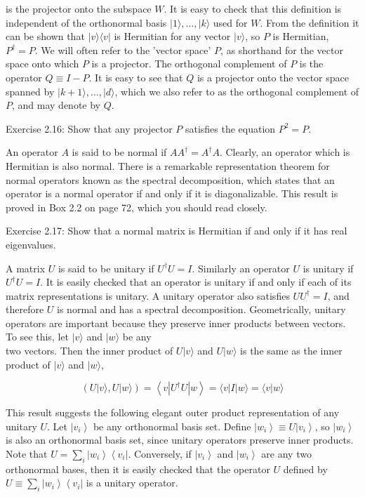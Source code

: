 is the projector onto the subspace $W$. It is easy to check that this definition is independent of the orthonormal basis $|1\rangle, \ldots,|k\rangle$ used for $W$. From the definition it can be shown that $|v\rangle\langle v|$ is Hermitian for any vector $|v\rangle$, so $P$ is Hermitian, $P^{\dagger}=P$. We will often refer to the 'vector space' $P$, as shorthand for the vector space onto which $P$ is a projector. The orthogonal complement of $P$ is the operator $Q \equiv I-P$. It is easy to see that $Q$ is a projector onto the vector space spanned by $|k+1\rangle, \ldots,|d\rangle$, which we also refer to as the orthogonal complement of $P$, and may denote by $Q$.

Exercise 2.16: Show that any projector $P$ satisfies the equation $P^{2}=P$.

An operator $A$ is said to be normal if $A A^{\dagger}=A^{\dagger} A$. Clearly, an operator which is Hermitian is also normal. There is a remarkable representation theorem for normal operators known as the spectral decomposition, which states that an operator is a normal operator if and only if it is diagonalizable. This result is proved in Box 2.2 on page 72, which you should read closely.

Exercise 2.17: Show that a normal matrix is Hermitian if and only if it has real eigenvalues.

A matrix $U$ is said to be unitary if $U^{\dagger} U=I$. Similarly an operator $U$ is unitary if $U^{\dagger} U=I$. It is easily checked that an operator is unitary if and only if each of its matrix representations is unitary. A unitary operator also satisfies $U U^{\dagger}=I$, and therefore $U$ is normal and has a spectral decomposition. Geometrically, unitary operators are important because they preserve inner products between vectors. To see this, let $|v\rangle$ and $|w\rangle$ be any\\
two vectors. Then the inner product of $U|v\rangle$ and $U|w\rangle$ is the same as the inner product of $|v\rangle$ and $|w\rangle$,

$$
(U|v\rangle, U|w\rangle)=\left\langle v\left|U^{\dagger} U\right| w\right\rangle=\langle v|I| w\rangle=\langle v | w\rangle
$$

This result suggests the following elegant outer product representation of any unitary $U$. Let $\left|v_{i}\right\rangle$ be any orthonormal basis set. Define $\left|w_{i}\right\rangle \equiv U\left|v_{i}\right\rangle$, so $\left|w_{i}\right\rangle$ is also an orthonormal basis set, since unitary operators preserve inner products. Note that $U=\sum_{i}\left|w_{i}\right\rangle\left\langle v_{i}\right|$. Conversely, if $\left|v_{i}\right\rangle$ and $\left|w_{i}\right\rangle$ are any two orthonormal bases, then it is easily checked that the operator $U$ defined by $U \equiv \sum_{i}\left|w_{i}\right\rangle\left\langle v_{i}\right|$ is a unitary operator.

